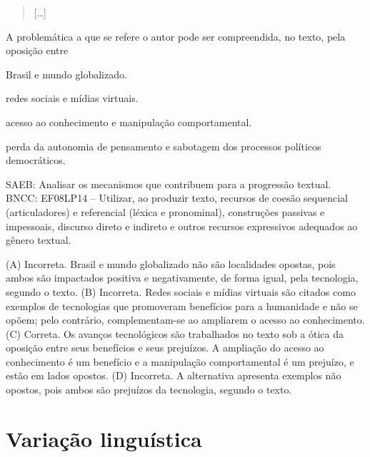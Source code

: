\begin{quote}
{[}\ldots{]}
\end{quote}


A problemática a que se refere o autor pode ser compreendida, no texto,
pela oposição entre

\begin{escolha}
\item Brasil e mundo globalizado.

\item redes sociais e mídias virtuais.

\item acesso ao conhecimento e manipulação comportamental.

\item perda da autonomia de pensamento e sabotagem dos processos políticos
democráticos.
\end{escolha}

SAEB: Analisar os mecanismos que contribuem para a progressão textual.
BNCC: EF08LP14 -- Utilizar, ao produzir texto, recursos de coesão
sequencial (articuladores) e referencial (léxica e pronominal),
construções passivas e impessoais, discurso direto e indireto e outros
recursos expressivos adequados ao gênero textual.

(A) Incorreta. Brasil e mundo globalizado não são localidades opostas,
pois ambos são impactados positiva e negativamente, de forma igual, pela
tecnologia, segundo o texto. (B) Incorreta. Redes sociais e mídias
virtuais são citados como exemplos de tecnologias que promoveram
benefícios para a humanidade e não se opõem; pelo contrário,
complementam-se ao ampliarem o acesso ao conhecimento. (C) Correta. Os
avanços tecnológicos são trabalhados no texto sob a ótica da oposição
entre seus benefícios e seus prejuízos. A ampliação do acesso ao
conhecimento é um benefício e a manipulação comportamental é um
prejuízo, e estão em lados opostos. (D) Incorreta. A alternativa
apresenta exemplos não opostos, pois ambos são prejuízos da tecnologia,
segundo o texto.

\chapter{Variação linguística}


